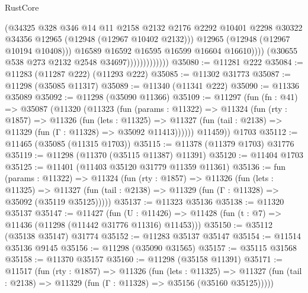 \begin{lexlean}{RustCore}
\begin{coremodule}
                                      (@34325
                                        @328
                                        @346
                                        @14
                                        @11
                                        @2158
                                        @2132
                                        @2176
                                        @2292
                                        @10401
                                        @2298
                                        @30322
                                        @34356
                                        @12965
                                        (@12948 (@12967 @10402 @2132)))
                                      @12965
                                      (@12948 (@12967 @10194 @10408)))
                                    @16589
                                    @16592
                                    @16595
                                    @16599
                                    @16604
                                    @16610))))
                            (@30655 @538 @273 @2132 @2548 @34697)))))))))))))
@35080 := @11281 @222
@35084 := @11283 (@11287 @222) (@11293 @222)
@35085 := @11302 @31773
@35087 := @11298 (@35085 @11317)
@35089 := @11340 (@11341 @222)
@35090 := @11336 @35089
@35092 := @11298 (@35090 @11366)
@35109 := @11297
    (fun (fn : @41) =>
    @35087
      (@11320
        (@11323
          (fun (params : @11322) =>
          @11324
            (fun (rty : @1857) =>
            @11326
              (fun (lets : @11325) =>
              @11327 (fun (tail : @2138) => @11329 (fun (Γ : @11328) => @35092 @11413))))))
        @11459))
    @1703
@35112 := @11465 (@35085 (@11315 @1703))
@35115 := @11378 (@11379 @1703) @31776
@35119 := @11298 (@11370 (@35115 @11387) @11391)
@35120 := @11404 @1703
@35125 := @11401 (@11403 @35120 @31779 @11359 @11361)
@35136 := fun (params : @11322) =>
  @11324
    (fun (rty : @1857) =>
    @11326
      (fun (lets : @11325) =>
      @11327 (fun (tail : @2138) => @11329 (fun (Γ : @11328) => @35092 (@35119 @35125)))))
@35137 := @11323 @35136
@35138 := @11320 @35137
@35147 := @11427
    (fun (U : @11426) => @11428 (fun (t : @7) => @11436 (@11298 (@11442 @31776 @11316) @11453)))
@35150 := @35112 (@35138 @35147) @31774
@35152 := @11283 @35137 @35147
@35154 := @11514 @35136 @9145
@35156 := @11298 (@35090 @31565)
@35157 := @35115 @31568
@35158 := @11370 @35157
@35160 := @11298 (@35158 @11391)
@35171 := @11517
    (fun (rty : @1857) =>
    @11326
      (fun (lets : @11325) =>
      @11327 (fun (tail : @2138) => @11329 (fun (Γ : @11328) => @35156 (@35160 @35125)))))

\end{coremodule}
\end{lexlean}
